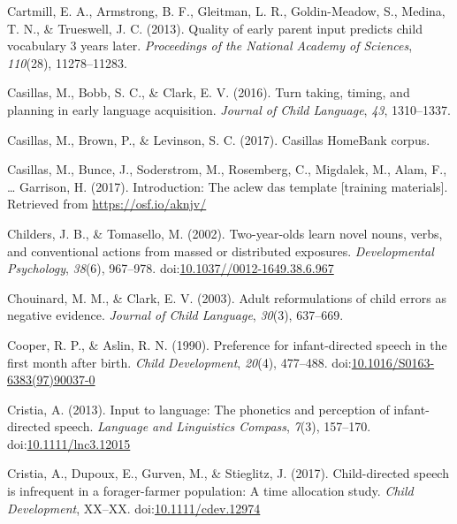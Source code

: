 \documentclass[floatsintext,man]{apa6}
\theoremstyle{definition}
\theoremstyle{definition}
\theoremstyle{definition}
\theoremstyle{remark}
\begin{document}
\hypertarget{ref-cartmill2013quality}{}
Cartmill, E. A., Armstrong, B. F., Gleitman, L. R., Goldin-Meadow, S.,
Medina, T. N., \& Trueswell, J. C. (2013). Quality of early parent input
predicts child vocabulary 3 years later. \emph{Proceedings of the
National Academy of Sciences}, \emph{110}(28), 11278--11283.

\hypertarget{ref-casillas2016turn}{}
Casillas, M., Bobb, S. C., \& Clark, E. V. (2016). Turn taking, timing,
and planning in early language acquisition. \emph{Journal of Child
Language}, \emph{43}, 1310--1337.

\hypertarget{ref-Casillas-HB}{}
Casillas, M., Brown, P., \& Levinson, S. C. (2017). Casillas HomeBank
corpus.

\hypertarget{ref-casillas2017ACLEWDAS}{}
Casillas, M., Bunce, J., Soderstrom, M., Rosemberg, C., Migdalek, M.,
Alam, F., \ldots{} Garrison, H. (2017). Introduction: The aclew das
template {[}training materials{]}. Retrieved from
\url{https://osf.io/aknjv/}

\hypertarget{ref-childers2002two}{}
Childers, J. B., \& Tomasello, M. (2002). Two-year-olds learn novel
nouns, verbs, and conventional actions from massed or distributed
exposures. \emph{Developmental Psychology}, \emph{38}(6), 967--978.
doi:\href{https://doi.org/10.1037//0012-1649.38.6.967}{10.1037//0012-1649.38.6.967}

\hypertarget{ref-chouinard2003adult}{}
Chouinard, M. M., \& Clark, E. V. (2003). Adult reformulations of child
errors as negative evidence. \emph{Journal of Child Language},
\emph{30}(3), 637--669.

\hypertarget{ref-cooper1990preference}{}
Cooper, R. P., \& Aslin, R. N. (1990). Preference for infant-directed
speech in the first month after birth. \emph{Child Development},
\emph{20}(4), 477--488.
doi:\href{https://doi.org/10.1016/S0163-6383(97)90037-0}{10.1016/S0163-6383(97)90037-0}

\hypertarget{ref-cristia2013input}{}
Cristia, A. (2013). Input to language: The phonetics and perception of
infant-directed speech. \emph{Language and Linguistics Compass},
\emph{7}(3), 157--170.
doi:\href{https://doi.org/10.1111/lnc3.12015}{10.1111/lnc3.12015}

\hypertarget{ref-cristia2017child}{}
Cristia, A., Dupoux, E., Gurven, M., \& Stieglitz, J. (2017).
Child-directed speech is infrequent in a forager-farmer population: A
time allocation study. \emph{Child Development}, XX--XX.
doi:\href{https://doi.org/10.1111/cdev.12974}{10.1111/cdev.12974}
\end{document}
